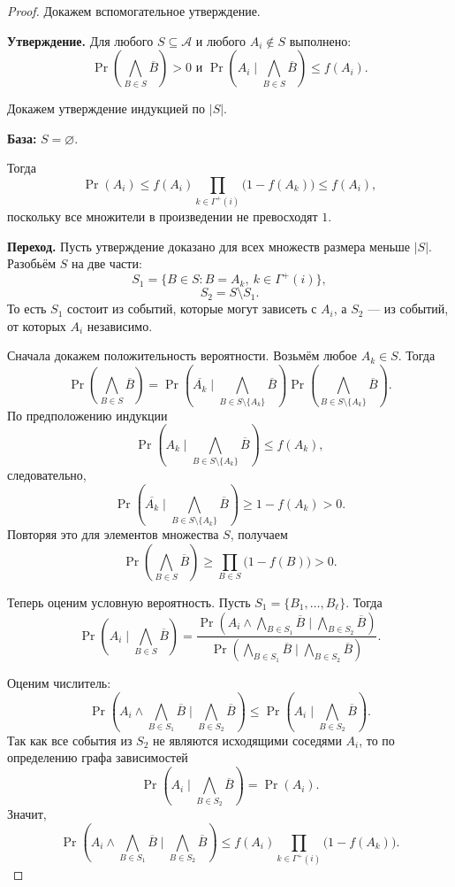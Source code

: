 \begin{proof}
	Докажем вспомогательное утверждение.
	
	\medskip
	\noindent
	\textbf{Утверждение.}
	Для любого $S\subseteq \mathcal A$ и любого $A_i\notin S$ выполнено:
	\[
	\Pr\!\left(\bigwedge_{B\in S}\overline B\right)>0 \text{ и }
	\Pr\!\left(A_i\mid \bigwedge_{B\in S}\overline B\right)\le f(A_i).
	\]
	
	\medskip
	Докажем утверждение индукцией по $|S|$.
	
	\medskip
	\noindent
	\textbf{База:} $S=\varnothing$.
	
	Тогда
	\[
	\Pr(A_i)
	\le
	f(A_i)\prod_{k\in \Gamma^+(i)}\bigl(1-f(A_k)\bigr)
	\le f(A_i),
	\]
	поскольку все множители в произведении не превосходят $1$.
	
	\medskip
	\noindent
	\textbf{Переход.}
	Пусть утверждение доказано для всех множеств размера меньше $|S|$.
	Разобьём $S$ на две части:
	\[
	S_1=\{B\in S : B=A_k,\ k\in \Gamma^+(i)\},
	\]
	\[
	S_2=S\setminus S_1.
	\]
	То есть $S_1$ состоит из событий, которые могут зависеть с $A_i$, а $S_2$ — из событий,
	от которых $A_i$ независимо.
	
	Сначала докажем положительность вероятности.
	Возьмём любое $A_k\in S$. Тогда
	\[
	\Pr\!\left(\bigwedge_{B\in S}\overline B\right)
	=
	\Pr\!\left(
	\overline{A_k}
	\mid
	\bigwedge_{B\in S\setminus\{A_k\}}\overline B
	\right)
	\Pr\!\left(
	\bigwedge_{B\in S\setminus\{A_k\}}\overline B
	\right).
	\]
	По предположению индукции
	\[
	\Pr\!\left(
	A_k
	\mid
	\bigwedge_{B\in S\setminus\{A_k\}}\overline B
	\right)
	\le f(A_k),
	\]
	следовательно,
	\[
	\Pr\!\left(
	\overline{A_k}
	\mid
	\bigwedge_{B\in S\setminus\{A_k\}}\overline B
	\right)
	\ge 1-f(A_k)>0.
	\]
	Повторяя это для элементов множества $S$, получаем
	\[
	\Pr\!\left(\bigwedge_{B\in S}\overline B\right)
	\ge
	\prod_{B\in S}\bigl(1-f(B)\bigr)>0.
	\]
	
	Теперь оценим условную вероятность.
	Пусть $S_1=\{B_1,\dots,B_\ell\}.$ Тогда
	\[
	\Pr\!\left(A_i\mid \bigwedge_{B\in S}\overline B\right)
	=
	\frac{
		\Pr\!\left(
		A_i\wedge \bigwedge_{B\in S_1}\overline B
		\mid
		\bigwedge_{B\in S_2}\overline B
		\right)
	}{
		\Pr\!\left(
		\bigwedge_{B\in S_1}\overline B
		\mid
		\bigwedge_{B\in S_2}\overline B
		\right)
	}.
	\]
	
	Оценим числитель:
	\[
	\Pr\!\left(
	A_i\wedge \bigwedge_{B\in S_1}\overline B
	\mid
	\bigwedge_{B\in S_2}\overline B
	\right)
	\le
	\Pr\!\left(
	A_i
	\mid
	\bigwedge_{B\in S_2}\overline B
	\right).
	\]
	Так как все события из $S_2$ не являются исходящими соседями $A_i$, то по определению
	графа зависимостей
	\[
	\Pr\!\left(
	A_i
	\mid
	\bigwedge_{B\in S_2}\overline B
	\right)
	=
	\Pr(A_i).
	\]
	Значит,
	\[
	\Pr\!\left(
	A_i\wedge \bigwedge_{B\in S_1}\overline B
	\mid
	\bigwedge_{B\in S_2}\overline B
	\right)
	\le
	f(A_i)\prod_{k\in \Gamma^+(i)}\bigl(1-f(A_k)\bigr).
	\]
	

\end{proof}
